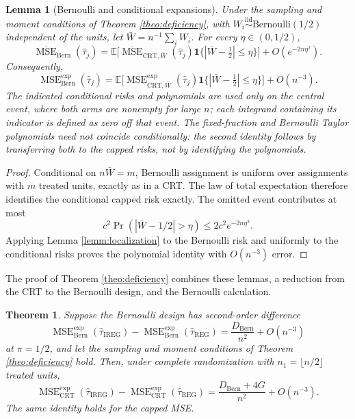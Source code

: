 \documentclass{article}
\newcommand{\EEE}{\mathbb{E}}
\newcommand{\htau}{\hat{\tau}}
\DeclareMathOperator{\MSE}{MSE}
\newcommand{\Bern}{\mathrm{Bern}}
\newcommand{\CRT}{\mathrm{CRT}}
\newcommand{\IREG}{\mathrm{IREG}}
\newcommand{\REG}{\mathrm{REG}}
\newcommand{\MSEexp}{\MSE^{\mathrm{exp}}}
\theoremstyle{plain}
\newtheorem{lemm}[prop]{Lemma}
\newtheorem{theo}[prop]{Theorem}
\theoremstyle{definition}
\theoremstyle{remark}
\begin{document}
\begin{lemm}[Bernoulli and conditional expansions]
\label{lemm:bern_conditional}
Under the sampling and moment conditions of Theorem
\ref{theo:deficiency}, with
$W_i\stackrel{\mathrm{iid}}{\sim}\mathrm{Bernoulli}(1/2)$
independent of the units, let $\bar W=n^{-1}\sum_iW_i$.
For every $\eta\in(0,1/2)$,
\[
\overline{\operatorname{MSE}}_\Bern(\htau_j)
=\EEE\Big[
\overline{\operatorname{MSE}}_{\CRT,\bar W}(\htau_j)
\mathbf 1\{|\bar W-\tfrac12|\le\eta\}\Big]
+O(e^{-2n\eta^2}).
\]
Consequently,
\[
\MSEexp_\Bern(\htau_j)
=\EEE\Big[\MSEexp_{\CRT,\bar W}(\htau_j)
\mathbf 1\{|\bar W-\tfrac12|\le\eta\}\Big]+O(n^{-3}).
\]
The indicated conditional risks and polynomials are used only on
the central event, where both arms are nonempty for large $n$;
each integrand containing its indicator is defined as zero off
that event. The fixed-fraction and Bernoulli Taylor polynomials
need not coincide conditionally: the second identity follows by
transferring both to the capped risks, not by identifying the polynomials.
\end{lemm}

\begin{proof}
Conditional on $n\bar W=m$, Bernoulli assignment is uniform over
assignments with $m$ treated units, exactly as in a CRT. The law of
total expectation therefore identifies the conditional capped risk
exactly. The omitted event contributes at most
\[
c^2\Pr(|\bar W-1/2|>\eta)\le2c^2e^{-2n\eta^2}.
\]
Applying Lemma \ref{lemm:localization} to the Bernoulli risk and
uniformly to the conditional risks proves the polynomial identity
with $O(n^{-3})$ error.
\end{proof}

The proof of Theorem \ref{theo:deficiency} combines these lemmas, a
reduction from the CRT to the Bernoulli design, and the Bernoulli
calculation.

\begin{theo}
\label{theo:crt_reduction}
Suppose the Bernoulli design has second-order difference
\begin{equation}
\label{eq:bern_second_order}
\MSEexp_\Bern(\hat{\tau}_\IREG)-\MSEexp_\Bern(\hat{\tau}_\REG)
=
\frac{D_\Bern}{n^2}+O(n^{-3})
\end{equation}
at $\pi=1/2$, and let the sampling and moment conditions of Theorem \ref{theo:deficiency} hold. Then, under
complete randomization with $n_1=\lfloor n/2\rfloor$ treated units,
\begin{equation}
\label{eq:crt_second_order}
\MSEexp_\CRT(\hat{\tau}_\IREG)-\MSEexp_\CRT(\hat{\tau}_\REG)
=
\frac{D_\Bern+4G}{n^2}+O(n^{-3}).
\end{equation}
The same identity holds for the capped MSE.
\end{theo}
\end{document}

